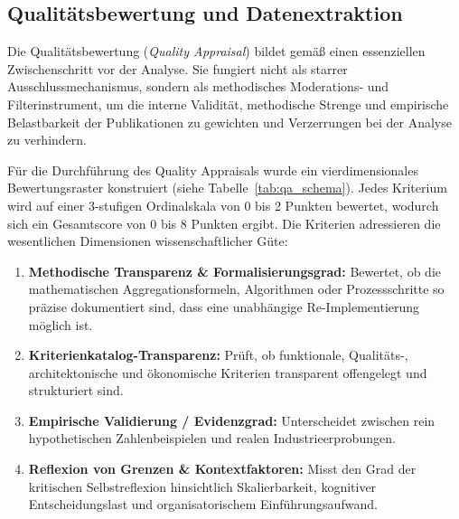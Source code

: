 \subsection{Qualitätsbewertung und Datenextraktion}
\label{subsec:qualitaetsbewertung_datenextraktion}

Die Qualitätsbewertung (\textit{Quality Appraisal}) bildet gemäß \textcite[S.~893 bis 896]{2NHFUF5N} einen essenziellen Zwischenschritt vor der Analyse. Sie fungiert nicht als starrer Ausschlussmechanismus, sondern als methodisches Moderations- und Filterinstrument, um die interne Validität, methodische Strenge und empirische Belastbarkeit der Publikationen zu gewichten und Verzerrungen bei der Analyse zu verhindern.

Für die Durchführung des Quality Appraisals wurde ein vierdimensionales Bewertungsraster konstruiert (siehe Tabelle~\ref{tab:qa_schema}). Jedes Kriterium wird auf einer 3-stufigen Ordinalskala von 0 bis 2 Punkten bewertet, wodurch sich ein Gesamtscore von 0 bis 8 Punkten ergibt. Die Kriterien adressieren die wesentlichen Dimensionen wissenschaftlicher Güte:
\begin{enumerate}[label=\textbf{QA\arabic*:}, leftmargin=*]
  \item \textbf{Methodische Transparenz \& Formalisierungsgrad:} Bewertet, ob die mathematischen Aggregationsformeln, Algorithmen oder Prozessschritte so präzise dokumentiert sind, dass eine unabhängige Re-Implementierung möglich ist.
  \item \textbf{Kriterienkatalog-Transparenz:} Prüft, ob funktionale, Qualitäts-, architektonische und ökonomische Kriterien transparent offengelegt und strukturiert sind.
  \item \textbf{Empirische Validierung / Evidenzgrad:} Unterscheidet zwischen rein hypothetischen Zahlenbeispielen und realen Industrieerprobungen.
  \item \textbf{Reflexion von Grenzen \& Kontextfaktoren:} Misst den Grad der kritischen Selbstreflexion hinsichtlich Skalierbarkeit, kognitiver Entscheidungslast und organisatorischem Einführungsaufwand.
\end{enumerate}

